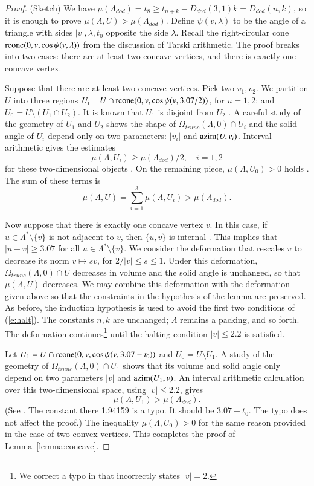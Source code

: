\begin{proof} (Sketch)  We have 
$\mu(\Lambda_{dod}) = t_8 \ge t_{n+k} - D_{dod}(3,1)k = D_{dod}(n,k)$, so it is
enough to prove $\mu(\Lambda,U) > \mu(\Lambda_{dod})$. 
Define $\psi(v,\lambda)$ to be the angle of a triangle with sides $|v|,\lambda,t_0$
opposite the side $\lambda$.  Recall the right-circular cone 
${\operatorname{rcone}}(0,v,\cos\psi(v,\lambda))$ from the discussion of Tarski arithmetic.
The proof breaks into two
cases: there are at least two concave vertices, and there is exactly one concave vertex.

Suppose that there are at least two concave vertices.  Pick two $v_1,v_2$.
We partition $U$ into three
regions $U_i = U\cap {\operatorname{rcone}}(0,v,\cos\psi(v,3.07/2))$, for $u=1,2$; and
$U_0= U\setminus (U_1\cap U_2)$.  It is known that
$U_1$ is disjoint from $U_2$ \cite[Lemma~3.7]{arx}.   A careful study of the geometry
of $U_1$ and $U_2$ shows the shape of $\Omega_{trunc}(\Lambda,0)\cap U_i$ and the
solid angle of $U_i$ depend only
on two parameters: $|v_i|$ and ${\operatorname{azim}}(U,v_i)$.  Interval arithmetic gives
the estimates
  $$\mu(\Lambda,U_i) \ge \mu(\Lambda_{dod})/2,\quad i=1,2$$
for these two-dimensional objects \cite[sec.7.2.6]{arx}.  On the remaining piece, $\mu(\Lambda,U_0)>0$ holds
\cite[p.138]{DCG}.  The sum of these terms is
  $$
  \mu(\Lambda,U) = \sum_{i=1}^3 \mu(\Lambda,U_i) > \mu(\Lambda_{dod}).
  $$

Now suppose that there is exactly one concave vertex $v$.  In this case, if $u\in\Lambda^*\setminus\{v\}$
is not adjacent to $v$, then $\{u,v\}$ is internal \cite[p.140]{DCG}.  This implies
that $|u-v|\ge 3.07$ for all $u\in\Lambda^*\setminus\{v\}$.
We consider the deformation that rescales $v$ to decrease its norm $v\mapsto s v$, for 
$2/|v|\le s\le 1$. Under this deformation, $\Omega_{trunc}(\Lambda,0)\cap U$ decreases
in volume and the solid angle is unchanged, so that $\mu(\Lambda,U)$ decreases.
We may combine this deformation with the deformation given above so that the
constraints in the hypothesis of the lemma are preserved.  As before, the induction
hypothesis is used to avoid the first two conditions of (\ref{e:halt}).
The constants $n,k$ are unchanged; $\Lambda$ remains a packing, and so forth.
The deformation continues\footnote{We correct a typo in \cite{arx} that  incorrectly states $|v|=2$.} until the halting condition $|v|\le 2.2$ is satisfied. 

Let $U_1 = U\cap {\operatorname{rcone}}(0,v,\cos\psi(v,3.07-t_0))$ and $U_0 = U
\setminus U_1$.  A study of the geometry of $\Omega_{trunc}(\Lambda,0)
\cap U_1$ shows that its volume and solid angle only depend 
on two parameters $|v|$ and
${\operatorname{azim}}(U_1,v)$.  An interval arithmetic calculation over this
two-dimensional space, using $|v|\le 2.2$, gives
$$
\mu(\Lambda,U_1) > \mu(\Lambda_{dod}).
$$
(See \cite[sec.7.2.6]{arx}. The constant there 1.94159 is a typo.
It should be $3.07-t_0$.  The typo does not affect the proof.)
The inequality $\mu(\Lambda,U_0)>0$ for the same reason provided
in the case of two convex vertices.  This completes
the proof of Lemma~\ref{lemma:concave}.
\end{proof}


